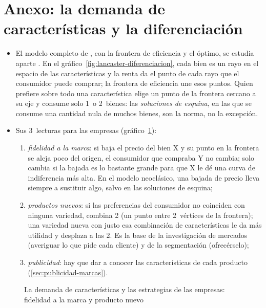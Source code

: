 \documentclass[11pt]{article}
\begin{document}
\section{Anexo: la demanda de características y la diferenciación}\label{anexo:lancaster-diferenciacion}

\begin{itemize}
\item El modelo completo de \textcite{Lancaster1966New}, con la frontera de eficiencia y el óptimo, se estudia aparte . En el gráfico~\ref{fig:lancaster-diferenciacion}, cada bien es un rayo en el espacio de las características y la renta da el punto de cada rayo que el consumidor puede comprar; la frontera de eficiencia une esos puntos. Quien prefiere sobre todo una característica elige un punto de la frontera cercano a su eje y consume solo 1~o 2~bienes: las \emph{soluciones de esquina}, en las que se consume una cantidad nula de muchos bienes, son la norma, no la excepción.
\item Sus 3~lecturas para las empresas (gráfico~\ref{fig:lancaster-estrategias}):
  \begin{enumerate}
  \item \emph{fidelidad a la marca}: si baja el precio del bien X y su punto en la frontera se aleja poco del origen, el consumidor que compraba Y no cambia; solo cambia si la bajada es lo bastante grande para que X le dé una curva de indiferencia más alta. En el modelo neoclásico, una bajada de precio lleva siempre a sustituir algo, salvo en las soluciones de esquina;
  \item \emph{productos nuevos}: si las preferencias del consumidor no coinciden con ninguna variedad, combina 2 (un punto entre 2~vértices de la frontera); una variedad nueva con justo esa combinación de características le da más utilidad y desplaza a las 2. Es la base de la investigación de mercados (averiguar lo que pide cada cliente) y de la segmentación (ofrecérselo);
  \item \emph{publicidad}: hay que dar a conocer las características de cada producto (\ref{sec:publicidad-marcas}).
  \end{enumerate}
\end{itemize}

\begin{figure}[H]
\centering
\caption{La demanda de características y las estrategias de las empresas: fidelidad a la marca y producto nuevo}\label{fig:lancaster-estrategias}
\end{figure}
\end{document}

